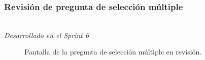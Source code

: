 \newpage

\subsubsection{Revisión de pregunta de selección múltiple}\mbox{}\\
\label{sec:pregunic1b}
\textit{Desarrollado en el Sprint 6}

\begin{figure}[H]%
  \centering
  \qquad
  \caption{Pantalla de la pregunta de selección múltiple en revisión.}%
  \label{fig:example}%
\end{figure}

